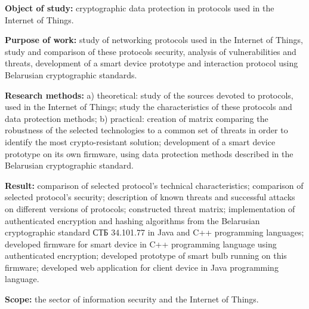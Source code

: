 \textbf{Object of study:} cryptographic data protection in protocols used in the Internet of Things.

\textbf{Purpose of work:} study of networking protocols used in the Internet of Things, study and 
comparison of these protocols security, analysis of vulnerabilities and threats, development 
of a smart device prototype and interaction protocol using Belarusian cryptographic standards.

\textbf{Research methods:} a) theoretical: study of the sources devoted to protocols, used in the 
Internet of Things; study the characteristics of these protocols and data protection methods; 
b) practical: creation of matrix comparing the robustness of the selected technologies to a common 
set of threats in order to identify the most crypto-resistant solution; development 
of a smart device prototype on its own firmware, using data protection methods described in the Belarusian 
cryptographic standard.

\textbf{Result:} comparison of selected protocol's technical characteristics; comparison of selected protocol's security; 
description of known threats and successful attacks on different versions of protocols; constructed threat matrix; 
implementation of authenticated encryption and hashing algorithms from the Belarusian cryptographic standard СТБ 34.101.77 
in Java and C++ programming languages; developed firmware for smart device in C++ programming language using 
authenticated encryption; developed prototype of smart bulb running on this firmware; developed web application 
for client device in Java programming language.

\textbf{Scope:} the sector of information security and the Internet of Things.
